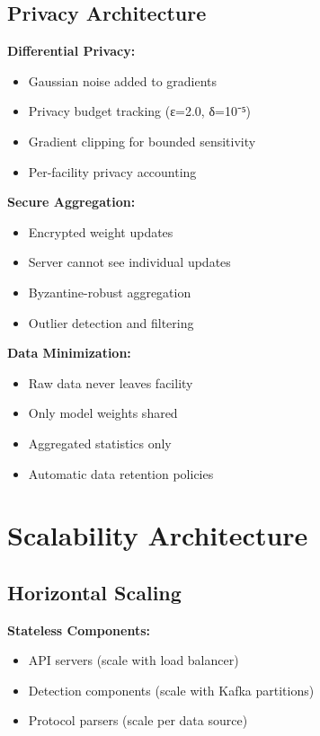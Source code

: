 \documentclass[12pt,a4paper]{article}
\begin{document}
\subsection{Privacy Architecture}

\textbf{Differential Privacy:}
\begin{itemize}[leftmargin=1cm,itemsep=0pt]
    \item Gaussian noise added to gradients
    \item Privacy budget tracking (ε=2.0, δ=10⁻⁵)
    \item Gradient clipping for bounded sensitivity
    \item Per-facility privacy accounting
\end{itemize}

\textbf{Secure Aggregation:}
\begin{itemize}[leftmargin=1cm,itemsep=0pt]
    \item Encrypted weight updates
    \item Server cannot see individual updates
    \item Byzantine-robust aggregation
    \item Outlier detection and filtering
\end{itemize}

\textbf{Data Minimization:}
\begin{itemize}[leftmargin=1cm,itemsep=0pt]
    \item Raw data never leaves facility
    \item Only model weights shared
    \item Aggregated statistics only
    \item Automatic data retention policies
\end{itemize}

\section{Scalability Architecture}

\subsection{Horizontal Scaling}

\textbf{Stateless Components:}
\begin{itemize}[leftmargin=1cm,itemsep=0pt]
    \item API servers (scale with load balancer)
    \item Detection components (scale with Kafka partitions)
    \item Protocol parsers (scale per data source)
\end{itemize}
\end{document}

